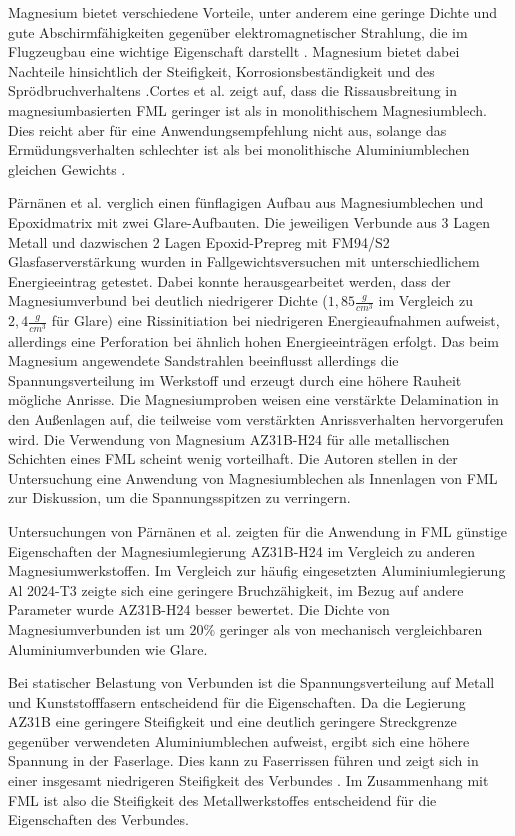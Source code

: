 Magnesium bietet verschiedene Vorteile, unter anderem eine geringe Dichte und gute Abschirmfähigkeiten gegenüber elektromagnetischer Strahlung, die im Flugzeugbau eine wichtige Eigenschaft darstellt \cite{Cortes.2005b}.
Magnesium bietet dabei Nachteile hinsichtlich der Steifigkeit, Korrosionsbeständigkeit und des Sprödbruchverhaltens \cite{Cortes.2005b,Alderliesten.2008}.Cortes et al.
\cite{Cortes.2005b} zeigt auf, dass die Rissausbreitung in magnesiumbasierten FML geringer ist als in monolithischem Magnesiumblech.
Dies reicht aber für eine Anwendungsempfehlung nicht aus, solange das Ermüdungsverhalten schlechter ist als bei monolithische Aluminiumblechen gleichen Gewichts \cite{Alderliesten.2008}.

Pärnänen et al. \cite{Parnanen.2012} verglich einen fünflagigen Aufbau aus Magnesiumblechen und Epoxidmatrix mit zwei Glare-Aufbauten.
Die jeweiligen Verbunde aus 3 Lagen Metall und dazwischen 2 Lagen Epoxid-Prepreg mit FM94/S2 Glasfaserverstärkung wurden in Fallgewichtsversuchen mit unterschiedlichem Energieeintrag getestet.
Dabei konnte herausgearbeitet werden, dass der Magnesiumverbund bei deutlich niedrigerer Dichte ($1,85 \frac{g}{cm^3}$ im Vergleich zu $2,4 \frac{g}{cm^3}$ für Glare) eine Rissinitiation bei niedrigeren Energieaufnahmen aufweist, allerdings eine Perforation bei ähnlich hohen Energieeinträgen erfolgt.
Das beim Magnesium angewendete Sandstrahlen beeinflusst allerdings die Spannungsverteilung im Werkstoff und erzeugt durch eine höhere Rauheit mögliche Anrisse.
Die Magnesiumproben weisen eine verstärkte Delamination in den Außenlagen auf, die teilweise vom verstärkten Anrissverhalten hervorgerufen wird.
Die Verwendung von Magnesium AZ31B-H24 für alle metallischen Schichten eines FML scheint wenig vorteilhaft.
Die Autoren stellen in der Untersuchung eine Anwendung von Magnesiumblechen als Innenlagen von FML zur Diskussion, um die Spannungsspitzen zu verringern.

Untersuchungen von Pärnänen et al. \cite{Parnanen.2012} zeigten für die Anwendung in FML günstige Eigenschaften der Magnesiumlegierung AZ31B-H24 im Vergleich zu anderen Magnesiumwerkstoffen.
Im Vergleich zur häufig eingesetzten Aluminiumlegierung Al 2024-T3 zeigte sich eine geringere Bruchzähigkeit, im Bezug auf andere Parameter wurde AZ31B-H24 besser bewertet.
Die Dichte von Magnesiumverbunden ist um $20 \%$ geringer als von mechanisch vergleichbaren Aluminiumverbunden wie Glare.

Bei statischer Belastung von Verbunden ist die Spannungsverteilung auf Metall und Kunststofffasern entscheidend für die Eigenschaften.
Da die Legierung AZ31B eine geringere Steifigkeit und eine deutlich geringere Streckgrenze gegenüber verwendeten Aluminiumblechen aufweist, ergibt sich eine höhere Spannung in der Faserlage.
Dies kann zu Faserrissen führen und zeigt sich in einer insgesamt niedrigeren Steifigkeit des Verbundes \cite{Alderliesten.2008}.
Im Zusammenhang mit FML ist also die Steifigkeit des Metallwerkstoffes entscheidend für die Eigenschaften des Verbundes.


